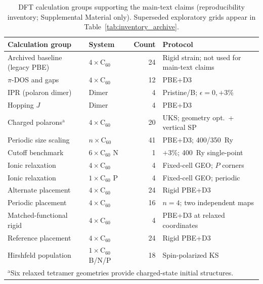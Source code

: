 \begin{table}[t]
\caption{\label{tab:inventory}DFT calculation groups supporting the main-text claims (reproducibility inventory; Supplemental Material only).
Superseded exploratory grids appear in Table~\ref{tab:inventory_archive}.}
\begin{ruledtabular}
\begin{tabular}{llrl}
Calculation group & System & Count & Protocol \\
\hline
Archived baseline (legacy PBE) & $4{\times}\mathrm{C}_{60}$ & 24 & Rigid strain; not used for main-text claims \\
$\pi$-DOS and gaps & $4{\times}\mathrm{C}_{60}$ & 12 & PBE+D3 \\
IPR (polaron dimer) & Dimer & 4 & Pristine/B; $\epsilon{=}0,+3$\% \\
Hopping $J$ & Dimer & 4 & PBE+D3 \\
Charged polarons$^{\mathrm{a}}$ & $4{\times}\mathrm{C}_{60}$ & 20 & UKS; geometry opt.\ + vertical SP \\
Periodic size scaling & $n{\times}\mathrm{C}_{60}$ & 41 & PBE+D3; 400/350~Ry \\
Cutoff benchmark & $6{\times}\mathrm{C}_{60}$ N & 1 & $+3$\%; 400~Ry single-point \\
Ionic relaxation & $4{\times}\mathrm{C}_{60}$ & 4 & Fixed-cell GEO; $P$ corners \\
Ionic relaxation & $1{\times}\mathrm{C}_{60}$ P & 4 & Fixed-cell GEO; periodic \\
Alternate placement & $4{\times}\mathrm{C}_{60}$ & 24 & Rigid PBE+D3 \\
Periodic placement & $4{\times}\mathrm{C}_{60}$ & 16 & $n{=}4$; two independent maps \\
Matched-functional rigid & $4{\times}\mathrm{C}_{60}$ & 4 & PBE+D3 at relaxed coordinates \\
Reference placement & $4{\times}\mathrm{C}_{60}$ & 24 & Rigid PBE+D3 \\
Hirshfeld population & $1{\times}\mathrm{C}_{60}$ B/N/P & 18 & Spin-polarized KS \\
\multicolumn{4}{l}{\footnotesize $^{\mathrm{a}}$Six relaxed tetramer geometries provide charged-state initial structures.} \\
\end{tabular}
\end{ruledtabular}
\end{table}
